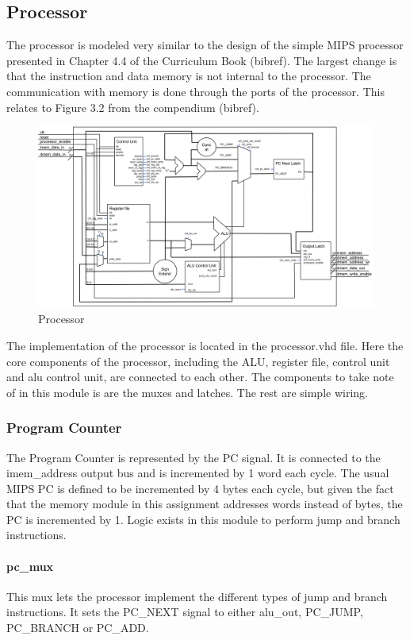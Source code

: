 \subsection{Processor}

The processor is modeled very similar to the design of the simple MIPS processor presented in Chapter 4.4 of the Curriculum Book (bibref). The largest change is that the instruction and data memory is not internal to the processor. The communication with memory is done through the ports of the processor. This relates to Figure 3.2 from the compendium (bibref). 

\begin{figure}[h]
	\centerline{\includegraphics[width=550px]{figures/processor.png}}
	\caption{Processor}
\end{figure}

The implementation of the processor is located in the processor.vhd file. Here the core components of the processor, including the ALU, register file, control unit and alu control unit, are connected to each other. The components to take note of in this module is are the muxes and latches. The rest are simple wiring. 

\subsubsection{Program Counter}
The Program Counter is represented by the PC signal. It is connected to the imem\_address output bus and is incremented by 1 word each cycle. The usual MIPS PC is defined to be incremented by 4 bytes each cycle, but given the fact that the memory module in this assignment addresses words instead of bytes, the PC is incremented by 1. Logic exists in this module to perform jump and branch instructions. 

\paragraph{pc\_mux} This mux lets the processor implement the different types of jump and branch instructions. It sets the PC\_NEXT signal to either alu\_out, PC\_JUMP, PC\_BRANCH or PC\_ADD. 

